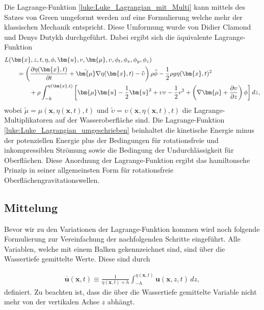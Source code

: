 Die Lagrange-Funktion \eqref{luke:Luke_Lagrangian_mit_Multi} kann mittels des Satzes von Green umgeformt werden auf eine Formulierung welche mehr der klassischen Mechanik entspricht.
Diese Umformung wurde von Didier Clamond und Denys Dutykh \cite{luke:CLAMOND201225} durchgeführt. Dabei ergibt sich die äquivalente Lagrange-Funktion
\begin{align}
&L(\bm{x},z,t,\eta,\phi,\bm{u}, v, \bm{\mu},\upsilon,\phi_t,\phi_x,\phi_y,\phi_z)
\notag
\\
&\qquad=
\left(\frac{\partial \eta(\bm{x},t)}{\partial t}
+
\tilde{\bm{\mu}} \nabla \eta(\bm{x},t)
-
\tilde{\upsilon}\right) \rho\tilde{\phi}
-
\frac{1}{2} \rho g \eta(\bm{x},t)^2
\notag
\\
&\qquad\qquad
	+
	\rho
	\int_{-h}^{\eta(\bm{x},t)} \left[ \bm{\mu}  \bm{u} - \frac{1}{2} \bm{u}^2 + \upsilon v - \frac{1}{2} v^2 + \left(\nabla \bm{\mu} + \frac{\partial \upsilon}{\partial z}\right) \phi \right] dz,
	\label{luke:Luke_Lagrangian_umgeschrieben}
\end{align}
wobei $\tilde{\mu} = \mu(\bm{x},\eta(\bm{x},t),t)$ und $\tilde{\upsilon} = \upsilon(\bm{x},\eta(\bm{x},t),t)$ die Lagrange-Multiplikatoren auf der Wasseroberfläche sind.
Die Lagrange-Funktion \eqref{luke:Luke_Lagrangian_umgeschrieben} beinhaltet die kinetische Energie minus der potenziellen Energie plus der Bedingungen für rotationsfreie und inkompressiblen Strömung sowie die Bedingung der Undurchlässigkeit für Oberflächen.
Diese Anordnung der Lagrange-Funktion ergibt das hamiltonsche Prinzip in seiner allgemeinsten Form für rotationsfreie Oberflächengravitationswellen.

\subsection{Mittelung}
Bevor wir zu den Variationen der Lagrange-Funktion kommen wird noch folgende Formulierung zur Vereinfachung der nachfolgenden Schritte eingeführt.
Alle Variablen, welche mit einem Balken gekennzeichnet sind, sind über die Wassertiefe gemittelte Werte. Diese sind durch

\begin{align}
	\overline{\bm{u}}(\bm{x}, t) \equiv \frac{1}{\eta(\bm{x}, t) + h} \int_{-h}^{\eta(\bm{x},t)} \bm{u}(\bm{x},z,t) \, dz,
	\label{luke:Mittelung_Wassertiefe}
\end{align}
definiert.
Zu beachten ist, dass die über die Wassertiefe gemittelte Variable nicht mehr von der vertikalen Achse $z$ abhängt.

